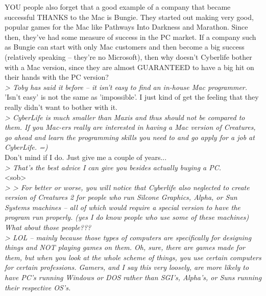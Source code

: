 \documentclass[11pt,twoside,a4paper]{article}
\begin{document}
\begin{multicols*}{2}
YOU people also forget that a good example of a company that became successful THANKS to the Mac is Bungie. They started out making very good, popular games for the Mac like Pathways Into Darkness and Marathon. Since then, they've had some measure of success in the PC market. If a company such as Bungie can start with only Mac customers and then become a big success (relatively speaking -- they're no Microsoft), then why doesn't Cyberlife bother with a Mac version, since they are almost GUARANTEED to have a big hit on their hands with the PC version?~\\

\emph{> Toby has said it before -- it isn't easy to find an in-house Mac programmer.} ~\\

'Isn't easy' is not the same as 'impossible'. I just kind of get the feeling that they really didn't want to bother with it. ~\\

\emph{> CyberLife is much smaller than Maxis and thus should not be compared to them. If you Mac-ers really are interested in having a Mac version of Creatures, go ahead and learn the programming skills you need to and go apply for a job at CyberLife. =) } ~\\

Don't mind if I do. Just give me a couple of years... ~\\

\emph{> That's the best advice I can give you besides actually buying a PC.} ~\\

<sob> ~\\

\emph{> > For better or worse, you will notice that Cyberlife also neglected to create version of Creatures 2 for people who run Silcone Graphics, Alpha, or Sun Systems machines -- all of which would require a special version to have the program run properly.  (yes I do know people who use some of these machines)  What about those people???} ~\\

\emph{> LOL -- mainly because those types of computers are specifically for designing things and NOT playing games on them. Oh, sure, there are games made for them, but when you look at the whole scheme of things, you use certain computers for certain professions. Gamers, and I say this very loosely, are more likely to have PC's running Windows or DOS rather than SGI's, Alpha's, or Suns running their respective OS's.} ~\\


\end{multicols*}
\end{document}
